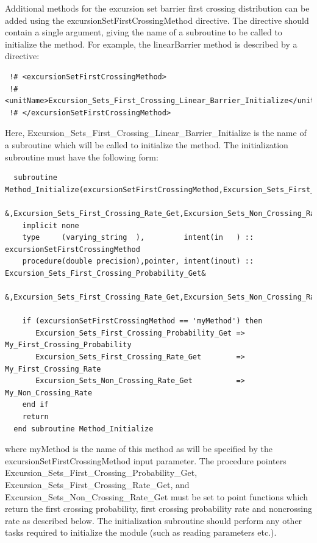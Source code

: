 Additional methods for the excursion set barrier first crossing distribution can be added using the {\normalfont \ttfamily excursionSetFirstCrossingMethod} directive. The directive should contain a single argument, giving the name of a subroutine to be called to initialize the method. For example, the {\normalfont \ttfamily linearBarrier} method is described by a directive:
\begin{verbatim}
 !# <excursionSetFirstCrossingMethod>
 !#  <unitName>Excursion_Sets_First_Crossing_Linear_Barrier_Initialize</unitName>
 !# </excursionSetFirstCrossingMethod>
\end{verbatim}
Here, {\normalfont \ttfamily Excursion\_Sets\_First\_Crossing\_Linear\_Barrier\_Initialize} is the name of a subroutine which will be called to initialize the method. The initialization subroutine must have the following form:
\begin{verbatim}
  subroutine Method_Initialize(excursionSetFirstCrossingMethod,Excursion_Sets_First_Crossing_Probability_Get&
         &,Excursion_Sets_First_Crossing_Rate_Get,Excursion_Sets_Non_Crossing_Rate_Get)
    implicit none
    type     (varying_string  ),         intent(in   ) :: excursionSetFirstCrossingMethod
    procedure(double precision),pointer, intent(inout) :: Excursion_Sets_First_Crossing_Probability_Get&
         &,Excursion_Sets_First_Crossing_Rate_Get,Excursion_Sets_Non_Crossing_Rate_Get
    
    if (excursionSetFirstCrossingMethod == 'myMethod') then
       Excursion_Sets_First_Crossing_Probability_Get => My_First_Crossing_Probability
       Excursion_Sets_First_Crossing_Rate_Get        => My_First_Crossing_Rate
       Excursion_Sets_Non_Crossing_Rate_Get          => My_Non_Crossing_Rate
    end if
    return
  end subroutine Method_Initialize
\end{verbatim}
where {\normalfont \ttfamily myMethod} is the name of this method as will be specified by the {\normalfont \ttfamily excursionSetFirstCrossingMethod} input parameter. The procedure pointers {\normalfont \ttfamily Excursion\_Sets\_First\_Crossing\_Probability\_Get}, {\normalfont \ttfamily Excursion\_Sets\_First\_Crossing\_Rate\_Get}, and {\normalfont \ttfamily Excursion\_Sets\_Non\_Crossing\_Rate\_Get} must be set to point functions which return the first crossing probability, first crossing probability rate and noncrossing rate as described below. The initialization subroutine should perform any other tasks required to initialize the module (such as reading parameters etc.).

